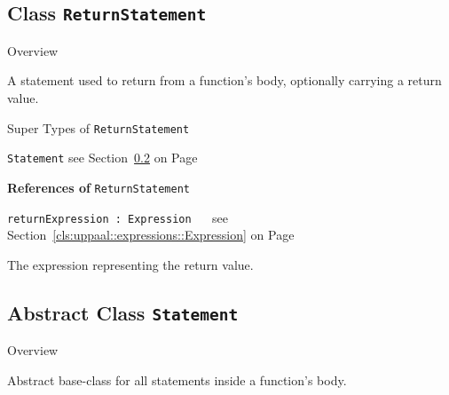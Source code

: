 \subsection{Class \bfseries \texttt{ReturnStatement}\normalfont}
\label{cls:uppaal::statements::ReturnStatement} 
	
	\begin{longdescription}
		\item[Overview] 		
				

	

		A statement used to return from a function's body, optionally carrying a return value.		
		\item[Super Types of \texttt{ReturnStatement}] ~
			\begin{longdescription}
				\item[\texttt{Statement}] see Section~\ref{cls:uppaal::statements::Statement} on Page~\pageref{cls:uppaal::statements::Statement}						\end{longdescription}
		
	
			\item[\textbf{References of} \texttt{ReturnStatement}] ~
			\begin{longdescription}
	\item[\texttt{returnExpression : Expression 	}] ~
	see Section~\ref{cls:uppaal::expressions::Expression} on Page~\pageref{cls:uppaal::expressions::Expression}
	
	\nopagebreak
		
				

	

		The expression representing the return value.		
			\end{longdescription}
	
	\end{longdescription}
	

\subsection{Abstract Class \bfseries \texttt{Statement}\normalfont}
\label{cls:uppaal::statements::Statement} 
	
	\begin{longdescription}
		\item[Overview] 		
				

	

		Abstract base-class for all statements inside a function's body.		
		
	
	
	\end{longdescription}
	

